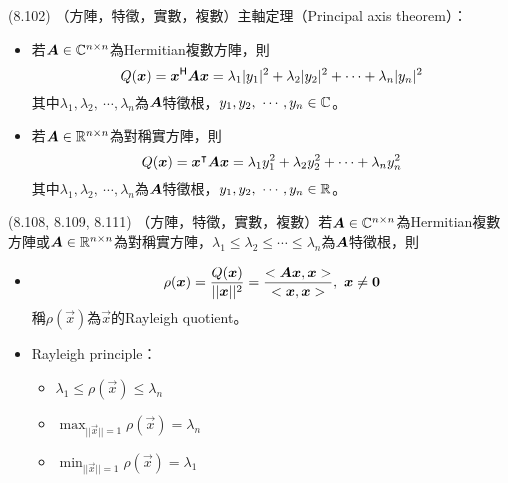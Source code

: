 \item \begin{theorem}{(8.102)} （方陣，特徵，實數，複數）主軸定理（Principal axis theorem）：
	\begin{itemize}
		\item 若$\boldsymbol{A} \in \mathbb{C}^{n \times n}$為Hermitian複數方陣，則
		\begin{equation}
			Q(\boldsymbol{x}) = \boldsymbol{x}^{\mathsf{H}}\boldsymbol{A}\boldsymbol{x} = \lambda_1|y_1|^2 + \lambda_2|y_2|^2 + \cdots + \lambda_n|y_n|^2
		\end{equation}
		其中$\lambda_1, \lambda_2, \ \cdots, \lambda_n$為$\boldsymbol{A}$特徵根，$y_1, y_2, \ \cdots, y_n \in \mathbb{C}$。
		\item 若$\boldsymbol{A} \in \mathbb{R}^{n \times n}$為對稱實方陣，則
		\begin{equation}
			Q(\boldsymbol{x}) = \boldsymbol{x}^\intercal\boldsymbol{A}\boldsymbol{x} = \lambda_1y_1^2 + \lambda_2y_2^2 + \cdots + \lambda_ny_n^2
		\end{equation}
		其中$\lambda_1, \lambda_2, \ \cdots, \lambda_n$為$\boldsymbol{A}$特徵根，$y_1, y_2, \ \cdots, y_n \in \mathbb{R}$。
	\end{itemize}
\end{theorem}

\item \begin{theorem}{(8.108, 8.109, 8.111)} （方陣，特徵，實數，複數）若$\boldsymbol{A} \in \mathbb{C}^{n \times n}$為Hermitian複數方陣或$\boldsymbol{A} \in \mathbb{R}^{n \times n}$為對稱實方陣，$\lambda_1 \le \lambda_2 \le \cdots \le \lambda_n$為$\boldsymbol{A}$特徵根，則
	\begin{itemize}
		\item 
		\begin{equation}
			\rho(\vec{x}) = \frac{Q(\vec{x})}{||\vec{x}||^2} = \frac{\dotp{\mat{A}\vec{x}}{\vec{x}}}{\dotp{\vec{x}}{\vec{x}}}, \ \vec{x} \neq \vec{0}
		\end{equation}
		稱$\rho(\vec{x})$為$\vec{x}$的Rayleigh quotient。
		\item Rayleigh principle：
		\begin{itemize}
			\item $\lambda_1 \le \rho(\vec{x}) \le \lambda_n$
			\item $\max_{||\vec{x}|| = 1}\rho(\vec{x}) = \lambda_n$
			\item $\min_{||\vec{x}|| = 1}\rho(\vec{x}) = \lambda_1$
		\end{itemize}
	\end{itemize}
\end{theorem}

